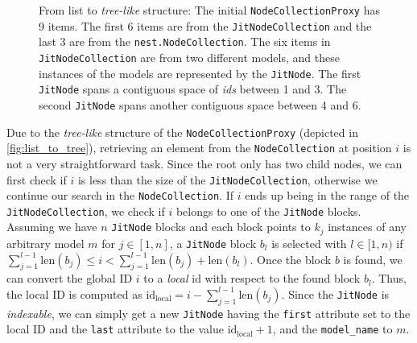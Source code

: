 \begin{figure}[ht!]
{\begin{tikzpicture}[x=0.75pt,y=0.75pt,yscale=-1,xscale=1]
\end{tikzpicture}
}
    \caption{From list to \emph{tree-like} structure: The initial \texttt{NodeCollectionProxy} has 9 items. The first 6 items are from the \texttt{JitNodeCollection} and the last 3 are from the \texttt{nest.NodeCollection}. The six items  in \texttt{JitNodeCollection} are from two different models, and these instances of the models are represented by the \texttt{JitNode}. The first \texttt{JitNode} spans a contiguous space of \emph{ids} between 1 and 3. The second \texttt{JitNode} spans another contiguous space between 4 and 6.}
    \label{fig:list_to_tree}
\end{figure}

Due to the \emph{tree-like} structure of the \texttt{NodeCollectionProxy} (depicted in \autoref{fig:list_to_tree}), retrieving an element from the \texttt{NodeCollection} at position $i$ is not a very straightforward task. Since the root only has two child nodes, we can first check if $i$ is less than the size of the \texttt{JitNodeCollection}, otherwise we continue our search in the \texttt{NodeCollection}. If $i$ ends up being in the range of the \texttt{JitNodeCollection}, we check if $i$ belongs to one of the \texttt{JitNode} blocks. Assuming we have $n$ \texttt{JitNode} blocks and each block points to $k_j$ instances of any arbitrary model $m$ for $j \in [1, n]$, a \texttt{JitNode} block $b_l$ is selected with $l \in [1, n)$ if $\sum_{j=1}^{l-1} \text{len}(b_j) \leq i < \sum_{j=1}^{l-1} \text{len}(b_j) + \text{len}(b_l)$. Once the block $b$ is found, we can convert the global ID $i$ to a \emph{local} id with respect to the found block $b_l$. Thus, the local ID is computed as $\text{id}_\text{local} = i -\sum_{j=1}^{l-1} \text{len}(b_j)$. Since the \texttt{JitNode} is \emph{indexable}, we can simply get a new \texttt{JitNode} having the \texttt{first} attribute set to the local ID and the \texttt{last} attribute to the value $\text{id}_\text{local} + 1$, and the \texttt{model\_name} to $m$.

